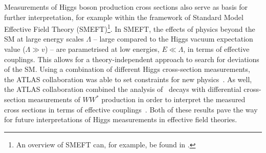 Measurements of Higgs boson production cross sections also serve as basis for further interpretation, for example within the framework of Standard Model Effective Field Theory (SMEFT)\footnote{An overview of SMEFT can, for example, be found in \ccite{}.}. In SMEFT, the effects of physics beyond the SM at large energy scales $\Lambda$ -- large compared to the Higgs vacuum expectation value ($\Lambda \gg v$) -- are parametrised at low energies, $E \ll \Lambda$, in terms of effective couplings. 
This allows for a theory-independent approach to search for deviations of the SM. 
Using a combination of different Higgs cross-section measurements, the ATLAS collaboration was able to set constraints for new physics~\cite{ATLAS-CONF-2020-053}.
As well, the ATLAS collaboration combined the analysis of \HWW\ decays with differential cross-section measurements of $WW^*$ production in order to interpret the measured cross sections in terms of effective couplings~\cite{ATL-PHYS-PUB-2021-010}.
Both of these results pave the way for future interpretations of Higgs measurements in effective field theories. %









